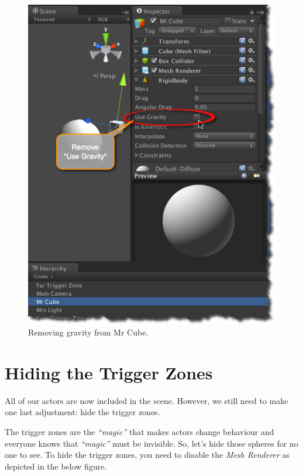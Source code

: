 \begin{figure}[htbp]
\centering
\includegraphics[keepaspectratio,width=\textwidth,height=0.75\textheight]{remove-gravity-from-mr-cube.png}
\caption{Removing gravity from Mr Cube.}
\label{remove-gravity-from-mr-cube.png}
\end{figure}

\section{Hiding the Trigger Zones}
\label{hidingthetriggerzones}

All of our actors are now included in the scene. However, we still need to make one last adjustment: hide the trigger zones.

The trigger zones are the \emph{``magic''} that makes actors change behaviour and everyone knows that \emph{``magic''} must be invisible. So, let's hide those spheres for no one to see. To hide the trigger zones, you need to disable the \emph{Mesh Renderer} as depicted in the below figure.

